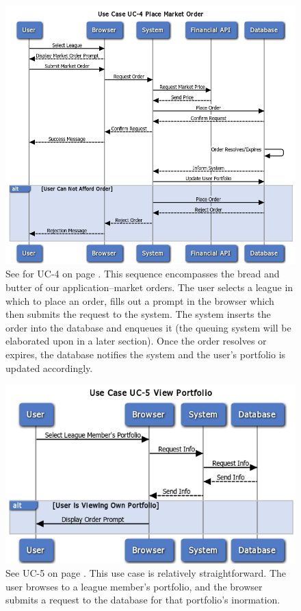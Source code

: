 \begin{figure}
\centering
\includegraphics[width=5.5in]{./Diagrams/SystemSequenceDiagrams/uc4.png}
\caption{See for UC-4 on page \pageref{UC-4}. This sequence encompasses the bread and butter of our application--market orders. The user selects a league in which to place an order, fills out a prompt in the browser which then submits the request to the system. The system inserts the order into the database and enqueues it (the queuing system will be elaborated upon in a later section). Once the order resolves or expires, the database notifies the system and the user's portfolio is updated accordingly.}
\end{figure}

\begin{figure}
\centering
\includegraphics[width=5.5in]{./Diagrams/SystemSequenceDiagrams/uc5.png}
\caption{See UC-5 on page \pageref{UC-5}. This use case is relatively straightforward. The user browses to a league member's portfolio, and the browser submits a request to the database for that portfolio's inormation.}
\end{figure}

